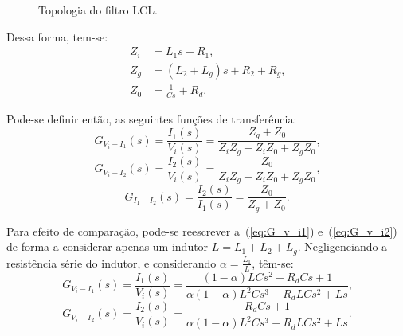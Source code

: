     \begin{figure}[htb]
        \centering{
            \def\svgwidth{\textwidth}
            }
        \renewcommand\figurename{Fig.}
        \caption{Topologia do filtro LCL.}
        \label{fig:LCL_topologia}
    \end{figure}

    Dessa forma, tem-se:
    \begin{equation}
    	\begin{split}
	        Z_i & = L_1s +R_1 \text{,} \\
	        Z_g & = (L_2 + L_g)s + R_2 + R_g \text{,} \\
	        Z_0 & = \frac{1}{Cs} + R_d \text{.}
	    \end{split}
    \end{equation}

    Pode-se definir então, as seguintes funções de transferência:
    \begin{equation}
        G_{V_i-I_1}(s) = \frac{I_1(s)}{V_i(s)} = \frac{Z_g + Z_0}{Z_iZ_g
        	+ Z_iZ_0 + Z_gZ_0} \text{,}
        \label{eq:G_v_i1}
    \end{equation}
    \begin{equation}
        G_{V_i-I_2}(s) = \frac{I_2(s)}{V_i(s)} = \frac{Z_0}{Z_iZ_g
        	+ Z_iZ_0 + Z_gZ_0} \text{,}
        \label{eq:G_v_i2}
    \end{equation}
    \begin{equation}
        G_{I_1-I_2}(s) = \frac{I_2(s)}{I_1(s)} = \frac{Z_0}{Z_g + Z_0}
        	 \text{.}
        \label{eq:G_i1_i2}
    \end{equation}

    Para efeito de comparação, pode-se reescrever a~(\ref{eq:G_v_i1}) e~(\ref{eq:G_v_i2}) de forma a considerar apenas um indutor $L = L_1 + L_2 + L_g$. Negligenciando a resistência série do indutor, e considerando $\alpha = \frac{L_1}{L}$, têm-se:
    \begin{equation}
        G_{V_i-I_1}(s) = \frac{I_1(s)}{V_i(s)} =
        	\frac{(1-\alpha)LCs^2+R_dCs+1}{\alpha(1-\alpha)L^2Cs^3+R_dLCs^2+Ls} \text{,}
    \end{equation}
    \begin{equation}
        G_{V_i-I_2}(s) = \frac{I_2(s)}{V_i(s)} =
        	\frac{R_dCs+1}{\alpha(1-\alpha)L^2Cs^3+R_dLCs^2+Ls}  \text{.}
        \label{eq:G_v_i2_2}
    \end{equation}

